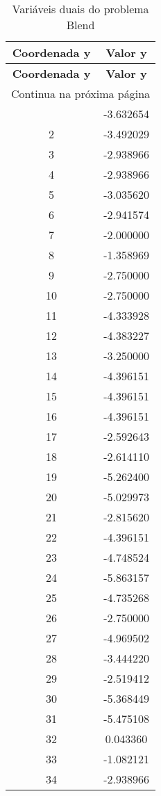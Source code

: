 \documentclass[12pt]{article}
\begin{document}
\begin{longtable}{@{}cc@{}}
\caption{Variáveis duais do problema Blend} \\
\toprule
\textbf{Coordenada y} & \textbf{Valor y} \\
\midrule
\endfirsthead

\toprule
\textbf{Coordenada y} & \textbf{Valor y} \\
\midrule
\endhead

\midrule \multicolumn{2}{r}{{Continua na próxima página}} \\ \midrule
\endfoot

\bottomrule
\endlastfoot
1 & -3.632654 \\
2 & -3.492029 \\
3 & -2.938966 \\
4 & -2.938966 \\
5 & -3.035620 \\
6 & -2.941574 \\
7 & -2.000000 \\
8 & -1.358969 \\
9 & -2.750000 \\
10 & -2.750000 \\
11 & -4.333928 \\
12 & -4.383227 \\
13 & -3.250000 \\
14 & -4.396151 \\
15 & -4.396151 \\
16 & -4.396151 \\
17 & -2.592643 \\
18 & -2.614110 \\
19 & -5.262400 \\
20 & -5.029973 \\
21 & -2.815620 \\
22 & -4.396151 \\
23 & -4.748524 \\
24 & -5.863157 \\
25 & -4.735268 \\
26 & -2.750000 \\
27 & -4.969502 \\
28 & -3.444220 \\
29 & -2.519412 \\
30 & -5.368449 \\
31 & -5.475108 \\
32 & 0.043360 \\
33 & -1.082121 \\
34 & -2.938966 \\

\end{longtable}
\end{document}
